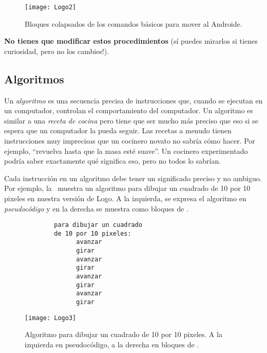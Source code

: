 \begin{figure}[H]
  \centering
  \texttt{[image: Logo2]}
  \caption{Bloques colapsados de los comandos básicos para mover al Androide.}
  \label{fig:Logo2}
\end{figure}

\textbf{No tienes que modificar estos procedimientos} (sí puedes
mirarlos si tienes curiosidad, pero no los cambies!).

\subsection*{Algoritmos}

Un \emph{algoritmo} es una secuencia precisa de instrucciones que,
cuando se ejecutan en un computador, controlan el comportamiento del
computador. Un algoritmo es similar a una \emph{receta de cocina} pero
tiene que ser mucho más preciso que eso si se espera que un computador
la pueda seguir. Las recetas a menudo tienen instrucciones muy
imprecisas que un cocinero novato no sabría cómo hacer. Por ejemplo,
``revuelva hasta que la masa esté suave''. Un cocinero experimentado
podría saber exactamente qué significa eso, pero no todos lo sabrían.

Cada instrucción en un algoritmo debe tener un significado preciso y
no ambiguo. Por ejemplo, la~ muestra un algoritmo para
dibujar un cuadrado de 10 por 10 pixeles en nuestra versión de Logo. A
la izquierda, se expresa el algoritmo en \emph{pseudocódigo} y en la
derecha se muestra como bloques de \AppInventor.

\begin{figure}[H]
\centering
\begin{minipage}{0.5\textwidth}
\centering
\begin{verbatim}
        para dibujar un cuadrado
        de 10 por 10 pixeles:
              avanzar
              girar
              avanzar
              girar
              avanzar
              girar
              avanzar
              girar
\end{verbatim}
\end{minipage}%
%
\begin{minipage}{0.5\textwidth}
  \centering
  \texttt{[image: Logo3]}
\end{minipage}
  \caption{Algoritmo para dibujar un cuadrado de 10 por 10 pixeles. A
    la izquierda en pseudocódigo, a la derecha en bloques de \AppInventor.}
  \label{fig:Logo3}
\end{figure}

